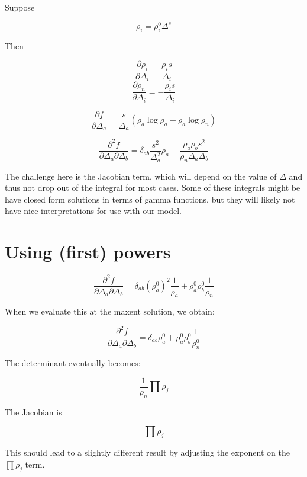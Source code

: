 \documentclass[12pt]{article}
\begin{document}
Suppose 

$$\rho_i = \rho_i^0 \Delta^s$$

Then

$$\frac{\partial \rho_i}{\partial \Delta_i} = \frac{\rho_i s}{\Delta_i}$$
$$\frac{\partial \rho_n}{\partial \Delta_i} = -\frac{\rho_i s}{\Delta_i}$$

$$\frac{\partial f}{\partial \Delta_a} = \frac{s}{\Delta_a}(\rho_a \log \rho_a - \rho_a \log \rho_n)$$

$$\frac{\partial^2 f}{\partial \Delta_a \partial \Delta_b} = \delta_{ab} \frac{s^2}{\Delta_a^2} \rho_a - \frac{\rho_a \rho_b s^2 }{\rho_n \Delta_a \Delta_b}$$

The challenge here is the Jacobian term, which will depend on the value of $\Delta$ and thus not drop out of the integral for most cases.  Some of these integrals might be have closed form solutions in terms of gamma functions, but they will likely not have nice interpretations for use with our model.

\section{Using (first) powers}

$$\frac{\partial^2 f}{\partial \Delta_a \partial \Delta_b} = \delta_{ab} (\rho_a^0)^2 \frac{1}{\rho_a} + \rho_a^0 \rho_b^0 \frac{1}{\rho_n}$$

When we evaluate this at the maxent solution, we obtain:

$$\frac{\partial^2 f}{\partial \Delta_a \partial \Delta_b} = \delta_{ab} \rho_a^0 + \rho_a^0 \rho_b^0 \frac{1}{\rho_n^0}$$

The determinant eventually becomes:

$$\frac{1}{\rho_n} \prod \rho_j$$

The Jacobian is 

$$\prod \rho_j$$

This should lead to a slightly different result by adjusting the exponent on the $\prod \rho_j$ term.
\end{document}
